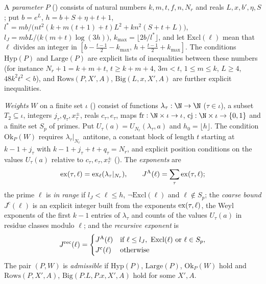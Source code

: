 \begin{definition}\label{pf:onto2:parwts}
A \emph{parameter} $P$ () consists of natural numbers
$k,m,t,f,n,N_r$ and reals $L,x,b',\eta,S$; put $b=e^L$, $h=b+S+\eta+t+1$, $l^*=mb/\bigl(nt^2(k+m(t+1)+t)L^2+kn^2(S+t+L)\bigr)$,
$l_J=mbL/\bigl(k(m+t)\log(3h)\bigr)$, $k_{\max}=\lfloor2b/l^*\rfloor$, and let $\mathrm{Excl}(\ell)$ mean that $\ell$ divides an integer
in $[b-\tfrac{t-1}2-k_{\max},\,h+\tfrac{t-1}2+k_{\max}]$. The conditions $\mathrm{Hyp}(P)$ and $\mathrm{Large}(P)$ are explicit lists of
inequalities between these numbers (for instance $N_r+1=k+m+t$, $t\ge k+m+4$, $3m<t$, $1\le m\le k$, $L\ge4$, $48k^2t^2<b$), and
$\mathrm{Rows}(P,X',A)$, $\mathrm{Big}(L,x,X',A)$ are further explicit inequalities.

\emph{Weights} $W$ on a finite set $\iota$ () consist of functions
$\lambda_\tau:\N\to\N$ ($\tau\in\iota$), a subset $T_2\subseteq\iota$, integers $j_\tau,q_\tau,x^\pm_\tau$, reals $c_\tau,e_\tau$, maps
$\mathrm{fr}:\N\times\iota\to\iota$, $\mathrm{cj}:\N\times\iota\to\{0,1\}$ and a finite set $S_p$ of primes. Put
$U_\tau(a)=U_{N_r}(\lambda_\tau,a)$ and $h_0=\lfloor h\rfloor$. The condition $\mathrm{Ok}_P(W)$ requires $\lambda_\tau|_{N_r}$ antitone, a
constant block of length $t$ starting at $k-1+j_\tau$ with $k-1+j_\tau+t+q_\tau=N_r$, and explicit position conditions on the values
$U_\tau(a)$ relative to $c_\tau,e_\tau,x^\pm_\tau$ (). The
\emph{exponents} are
\[
\operatorname{ex}(\tau,\ell)=\operatorname{ex}_\ell(\lambda_\tau|_{N_r}),\qquad J^{\mathrm{A}}(\ell)=\sum_\tau\operatorname{ex}(\tau,\ell);
\]
the prime $\ell$ is \emph{in range} if $l_J<\ell\le h$, $\neg\mathrm{Excl}(\ell)$ and $\ell\notin S_p$; the \emph{coarse bound}
$J^{\mathrm{c}}(\ell)$ is an explicit integer built from the exponents $\operatorname{ex}(\tau,\ell)$, the Weyl exponents of the first $k-1$
entries of $\lambda_\tau$ and counts of the values $U_\tau(a)$ in residue classes modulo $\ell$; and the \emph{recursive exponent} is
\[
J^{\mathrm{rec}}(\ell)=\begin{cases}J^{\mathrm{A}}(\ell)&\text{if }\ell\le l_J,\ \mathrm{Excl}(\ell)\text{ or }\ell\in S_p,\\
J^{\mathrm{c}}(\ell)&\text{otherwise}\end{cases}
\]
The pair $(P,W)$ is \emph{admissible} if $\mathrm{Hyp}(P)$,
$\mathrm{Large}(P)$, $\mathrm{Ok}_P(W)$ hold and $\mathrm{Rows}(P,X',A)$, $\mathrm{Big}(P.L,P.x,X',A)$ hold for some $X',A$.
\end{definition}

